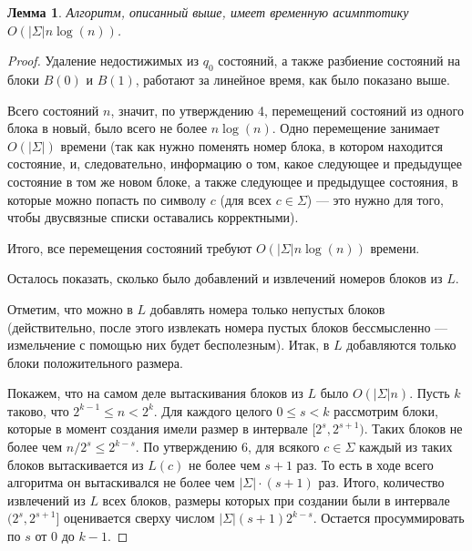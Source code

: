 \documentclass{article}
\newtheorem{lemma}{Лемма}
\begin{document}
\begin{lemma}
  \label{lemma5}
  Алгоритм, описанный выше, имеет временную асимптотику $O(|\Sigma|n\log(n))$.
\end{lemma}
\begin{proof}
  Удаление недостижимых из $q_0$ состояний, а также разбиение состояний на блоки $B(0)$ и $B(1)$, работают за линейное время, как было показано выше.

  Всего состояний $n$, значит, по утверждению 4, перемещений состояний из одного блока в новый, было всего не более $n \log(n)$. Одно перемещение занимает $O(|\Sigma|)$ времени (так как нужно поменять номер блока, в котором находится состояние, и, следовательно, информацию о том, какое следующее и предыдущее состояние в том же новом блоке, а также следующее и предыдущее состояния, в которые можно попасть по символу $c$ (для всех $c \in \Sigma$) --- это нужно для того, чтобы двусвязные списки оставались корректными).

  Итого, все перемещения состояний требуют $O(|\Sigma|n\log(n))$ времени.

  Осталось показать, сколько было добавлений и извлечений номеров блоков из $L$.

  Отметим, что можно в $L$ добавлять номера только непустых блоков (действительно, после этого извлекать номера пустых блоков бессмысленно --- измельчение с помощью них будет бесполезным). Итак, в $L$ добавляются только блоки положительного размера. %

  Покажем, что на самом деле вытаскивания блоков из $L$ было $O(|\Sigma|n)$. Пусть $k$ таково, что $2^{k - 1} \le n < 2^k$. Для каждого целого $0 \le s < k$ рассмотрим блоки, которые в момент создания имели размер в интервале $[2^s, 2^{s+1})$. Таких блоков не более чем $n / 2^s \le 2^{k-s}$. По утверждению 6, для всякого $c \in \Sigma$ каждый из таких блоков вытаскивается из $L(c)$ не более чем $s + 1$ раз. То есть в ходе всего алгоритма он вытаскивался не более чем $|\Sigma| \cdot (s + 1)$ раз. Итого, количество извлечений из $L$ всех блоков, размеры которых при создании были в интервале $(2^s, 2^{s+1}]$ оценивается сверху числом $|\Sigma| (s + 1) 2^{k-s}$. Остается просуммировать по $s$ от $0$ до $k - 1$.


\end{proof}
\end{document}
